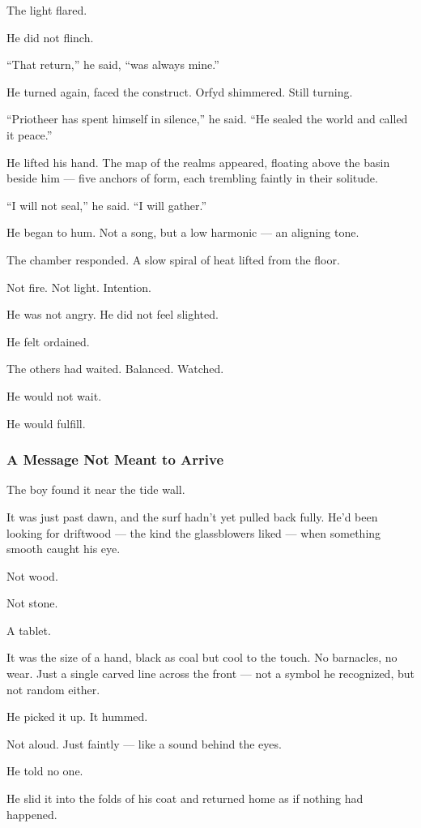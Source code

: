 \documentclass[12pt]{article}
\begin{document}
The light flared.

He did not flinch.

``That return,'' he said, ``was always mine.''

He turned again, faced the construct. Orfyd shimmered. Still turning.

``Priotheer has spent himself in silence,'' he said. ``He sealed the world and called it peace.''

He lifted his hand. The map of the realms appeared, floating above the basin beside him — five anchors of form, each trembling faintly in their solitude.

``I will not seal,'' he said. ``I will gather.''

He began to hum. Not a song, but a low harmonic — an aligning tone.

The chamber responded. A slow spiral of heat lifted from the floor.

Not fire. Not light. Intention.

He was not angry. He did not feel slighted.

He felt ordained.

The others had waited. Balanced. Watched.

He would not wait.

He would fulfill.


\dotfill

\subsubsection*{A Message Not Meant to Arrive}

The boy found it near the tide wall.

It was just past dawn, and the surf hadn’t yet pulled back fully. He’d been looking for driftwood — the kind the glassblowers liked — when something smooth caught his eye.

Not wood.

Not stone.

A tablet.

It was the size of a hand, black as coal but cool to the touch. No barnacles, no wear. Just a single carved line across the front — not a symbol he recognized, but not random either.

He picked it up. It hummed.

Not aloud. Just faintly — like a sound behind the eyes.

He told no one.

He slid it into the folds of his coat and returned home as if nothing had happened.
\end{document}
